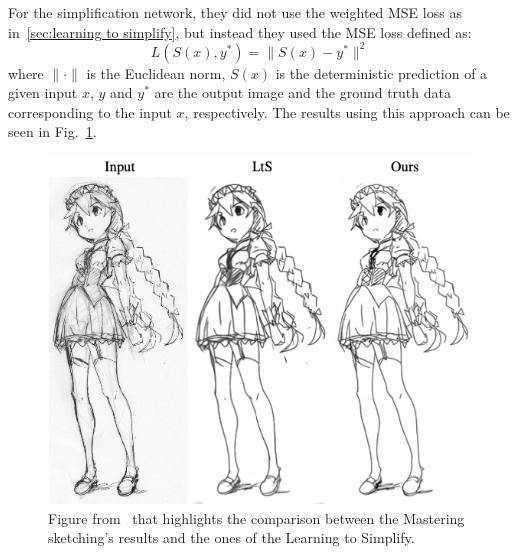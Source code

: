 \noindent For the simplification network, they did not use the weighted MSE loss as in~\ref{sec:learning to simplify}, but instead they used the MSE loss defined as:
\begin{equation}
    L(S(x),y^*)= \| S(x)-y^*\|^2
\end{equation}
where $\| \cdot \|$ is the Euclidean norm, $S(x)$ is the deterministic prediction of a given input $x$, $y$ and $y^*$ are the output image and the ground truth data corresponding to the input $x$, respectively. The results using this approach can be seen in Fig.~\ref{fig:Mastering sketching results}.
\begin{figure}[!ht]
\centering
  \includegraphics[scale=0.35]{figures/masteringSketchinResult.png}
  \caption{Figure from~\cite{masteringSketching} that highlights the comparison between the Mastering sketching's results and the ones of the Learning to Simplify.}
  \label{fig:Mastering sketching results}
\end{figure}

